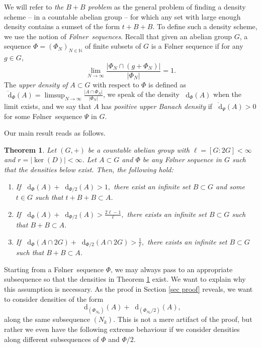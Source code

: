 \documentclass[reqno]{amsart}
\def\N{{\mathbb N}}
\newcommand*\diff{\mathop{}\!\mathrm{d}}
\newtheorem{theorem}{Theorem}[section]
\theoremstyle{definition}
\theoremstyle{remark}
\theoremstyle{remark}
\def\N{{\mathbb N}}
\newcommand{\Folner}{F\o{}lner}
\begin{document}
We will refer to \textit{the $B+B$ problem} as the general problem of finding a density scheme -- in a countable abelian group -- for which any set with large enough density contains a sumset of the form $t+B+B$. To define such a density scheme, we use the notion of \textit{\Folner\ sequences}. Recall that given an abelian group $G$, a sequence  
$\Phi=(\Phi_N)_{N\in \N}$ of finite subsets of $G$ is 
a \Folner{} sequence
if for any $g\in G$, 
\begin{equation*}
    \lim_{N\to \infty} 
\frac{|\Phi_N \cap (g+\Phi_N)|}{|\Phi_N|}=1.
\end{equation*}
The \textit{upper density of} $A\subset G$ with
respect to $\Phi$ is defined as   
$\overline{\diff}_{\Phi}(A)  = \limsup_{N\to \infty} \frac{|A\cap \Phi_N|}{|\Phi_N|}$, we speak of the density $\diff_{\Phi}(A)$ when the limit exists, and we say that $A$ has \textit{positive upper Banach density} if $\overline{\diff}_{\Psi}(A)>0$ for some \Folner\ sequence $\Psi$ in $G$. 

Our main result reads as follows. 

\begin{theorem}\label{main theorem}
Let $(G,+)$ be a countable abelian group with $\ell=[G:2G]<\infty$ and $r=|\ker(D)|<\infty$. Let $A\subset G$ and $\Phi$ be any \Folner{} sequence in $G$ such that the densities below exist. Then, the following hold:
\begin{enumerate}
\item  \label{main_theorem_1_2}
If 
$\diff_\Phi(A)+ \diff_{\Phi/2}(A)> 1,$
there exist an infinite set $B\subset G$ and some $t\in G$ such that 
$t+B+B\subset A$. 
\item  \label{main_theorem_1_1} 
\vspace{2mm} 
If 
$\diff_\Phi(A) + \diff_{\Phi/2}(A)> \frac{2\ell-1}{\ell},$
there exists an infinite set $B\subset G$ such that $B+B\subset A$. 
\item   \label{main_theorem_evens}  \vspace{2mm} If 
$ \diff_\Phi(A\cap 2G)+\diff_{\Phi/2}(A\cap 2G) > \frac{1}{\ell},$
there exists an infinite set $B\subset G$ such that $B+B\subset A$.
\end{enumerate}    
\end{theorem}

Starting from a \Folner\ sequence $\Phi$, we may always pass 
to an appropriate subsequence so that the densities in 
Theorem \ref{main theorem} exist. We want to explain why 
this assumption is necessary. As the proof in Section \ref{sec proof} reveals, we want to consider densities of the form 
$$\diff_{(\Phi_{N_k})}(A) + \diff_{(\Phi_{N_k}/2)}(A),$$
along the same subsequence $(N_k)$. This is not a mere 
artifact of the proof, but rather we even have the following extreme behaviour if we consider densities along different subsequences of $\Phi$ and $\Phi/2$. 
\end{document}
